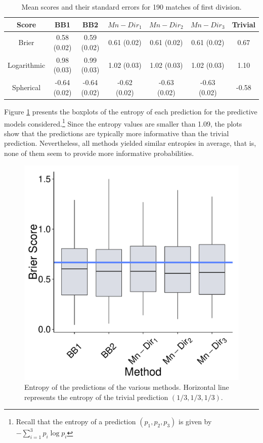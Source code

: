 \documentclass[journal,article,accept,moreauthors,pdftex,12pt,a4paper]{mdpi}
\begin{document}
	
	\begin{table}[H]
		\begin{center}
			\begin{tabular}{ccccccc}
				\hline
				Score & BB1 & BB2 & $Mn-Dir_1$ & $Mn-Dir_2$ & $Mn-Dir_3$ & Trivial \\
				\hline
				\hline
				Brier &0.58 (0.02) & 0.59 (0.02)& 0.61 (0.02)& 0.61 (0.02) & 0.61  (0.02) & 0.67 \\
				Logarithmic & 0.98 (0.03) & 0.99 (0.03) & 1.02 (0.03)  & 1.02 (0.03)  & 1.02 (0.03) & 1.10  \\
				Spherical &  -0.64 (0.02)& -0.64 (0.02)& -0.62 (0.02)& -0.63 (0.02)& -0.63 (0.02)& -0.58\\
				\hline
			\end{tabular}
			\caption{Mean scores and their standard errors for 190 matches of first division.}
			\label{tab::brier}
		\end{center}
	\end{table}
	
	
	Figure \ref{fig::entropy} presents the boxplots of the entropy of each prediction for the predictive models considered.\footnote{Recall
		that the entropy of a prediction $(p_1,p_2,p_3)$ is given by $- \sum_{i=1}^3 p_i \log{p_i}$}
	Since the entropy values are smaller than 1.09, the plots show that the predictions
	are typically more informative than the trivial prediction. Nevertheless, all methods yielded similar entropies in average, that is,
	none of them seem to provide more informative probabilities.
	
	
	
	\begin{figure}[H]
		\centering
		\includegraphics[page=10,scale=0.3]{futebolComparacaoModelosForPaper.pdf}
		\caption{Entropy of the predictions of the various methods. Horizontal line represents the entropy of the trivial prediction $(1/3,1/3,1/3)$.}
		\label{fig::entropy}
	\end{figure}
	
\end{document}
